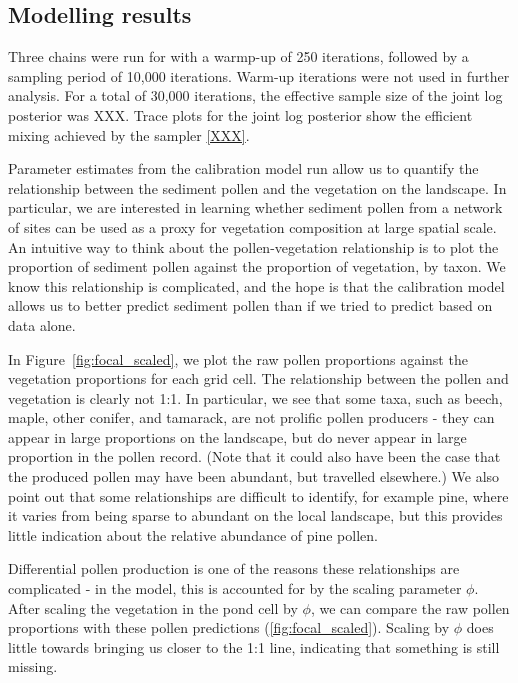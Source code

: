 \documentclass[12pt]{article}
\begin{document}
\subsection{Modelling results}

Three chains were run for with a warmp-up of 250 iterations, followed
by a sampling period of 10,000 iterations. Warm-up iterations were not
used in further analysis. For a total of 30,000 iterations, the
effective sample size of the joint log posterior was XXX. Trace plots
for the joint log posterior show the efficient mixing achieved by the
sampler \ref{XXX}.

Parameter estimates from the calibration model run allow us to
quantify the relationship between the sediment pollen and the
vegetation on the landscape. In particular, we are interested in
learning whether sediment pollen from a network of sites can be used
as a proxy for vegetation composition at large spatial scale. An
intuitive way to think about the pollen-vegetation relationship is to
plot the proportion of sediment pollen against the proportion of
vegetation, by taxon. We know this relationship is complicated, and
the hope is that the calibration model allows us to better predict
sediment pollen than if we tried to predict based on data alone. 

In Figure~\ref{fig:focal_scaled}, we plot the raw pollen proportions
against the vegetation proportions for each grid cell. The
relationship between the pollen and vegetation is clearly not 1:1. In
particular, we see that some taxa, such as beech, maple, other
conifer, and tamarack, are not prolific pollen producers - they can
appear in large proportions on the landscape, but do never appear in
large proportion in the pollen record. (Note that it could also have
been the case that the produced pollen may have been abundant, but
travelled elsewhere.) We also point out that some relationships are
difficult to identify, for example pine, where it varies from being
sparse to abundant on the local landscape, but this provides little
indication about the relative abundance of pine pollen.

Differential pollen production is one of the reasons these
relationships are complicated - in the model, this is accounted for by
the scaling parameter $\phi$. After scaling the vegetation in the pond
cell by $\phi$, we can compare the raw pollen proportions with these
pollen predictions (\ref{fig:focal_scaled}). Scaling by $\phi$ does little towards bringing us closer to the 1:1 line, indicating that something is still missing.
\end{document}
